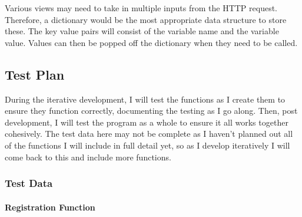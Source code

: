 \documentclass{article}
\begin{document}
Various views may need to take in multiple inputs from the HTTP request. Therefore, a dictionary would be the most appropriate data structure to store these. The key value pairs will consist of the variable name and the variable value. Values can then be popped off the dictionary when they need to be called. 

\subsection{Test Plan}

During the iterative development, I will test the functions as I create them to ensure they function correctly, documenting the testing as I go along. Then, post development, I will test the program as a whole to ensure it all works together cohesively. The test data here may not be complete as I haven't planned out all of the functions I will include in full detail yet, so as I develop iteratively I will come back to this and include more functions. 

\subsubsection{Test Data}

\paragraph{Registration Function}
\end{document}
